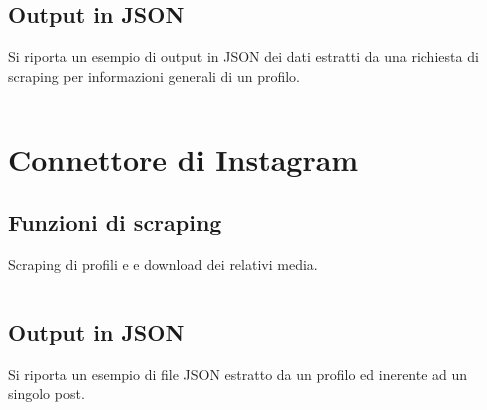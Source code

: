 \subsection{Output in JSON} \label{json_output_fb}
Si riporta un esempio di output in JSON dei dati estratti da una richiesta di scraping per informazioni generali di un profilo.
\inputminted[bgcolor=bg]{json}{codice/esempio_fb.json}

\section{Connettore di Instagram}\label{app:insta_codice}
\subsection{Funzioni di scraping}\label{scraping_funzioni_insta}
Scraping di profili e e download dei relativi media.
\inputminted[bgcolor=bg]{python}{codice/funzioni_scraping_insta.txt}

\subsection{Output in JSON}
Si riporta un esempio di file JSON estratto da un profilo ed inerente ad un singolo post.
\inputminted[bgcolor=bg]{json}{codice/output_insta.txt}